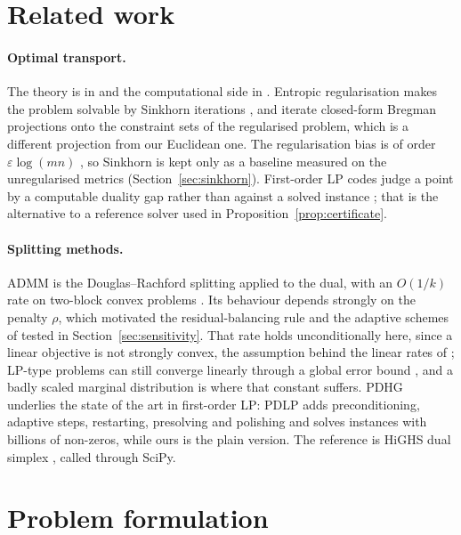 \documentclass{article}
\begin{document}
\section{Related work}

\paragraph{Optimal transport.}
The theory is in \citet{villani2009} and the computational side in \citet{peyre2019}.
Entropic regularisation makes the problem solvable by Sinkhorn iterations
\citep{cuturi2013}, and \citet{benamou2015} iterate closed-form Bregman projections onto
the constraint sets of the regularised problem, which is a different projection from our
Euclidean one. The regularisation bias is of order $\varepsilon\log(mn)$
\citep{peyre2019}, so Sinkhorn is kept only as a baseline measured on the unregularised
metrics (Section~\ref{sec:sinkhorn}). First-order LP codes judge a point by a computable
duality gap rather than against a solved instance \citep{applegate2021pdlp}; that is the
alternative to a reference solver used in Proposition~\ref{prop:certificate}.

\paragraph{Splitting methods.}
ADMM \citep{boyd2011admm} is the Douglas--Rachford splitting \citep{eckstein1992}
applied to the dual, with an $O(1/k)$ rate on two-block convex problems
\citep{he2012rate}. Its behaviour depends strongly on the penalty $\rho$, which motivated
the residual-balancing rule \citep{he2012rate} and the adaptive schemes of
\citet{goldstein2014} tested in Section~\ref{sec:sensitivity}. That rate holds
unconditionally here, since a linear objective is not strongly convex, the assumption
behind the linear rates of \citet{deng2016linear}; LP-type problems can still converge
linearly through a global error bound \citep{yang2016linear}, and a badly scaled marginal
distribution is where that constant suffers. PDHG \citep{chambolle2011} underlies the
state of the art in first-order LP: PDLP \citep{applegate2021pdlp,applegate2025pdlp} adds
preconditioning, adaptive steps, restarting, presolving and polishing and solves
instances with billions of non-zeros, while ours is the plain version. The reference is
HiGHS dual simplex \citep{huangfu2018highs}, called through SciPy.

\section{Problem formulation}
\label{sec:formulation}
\end{document}
